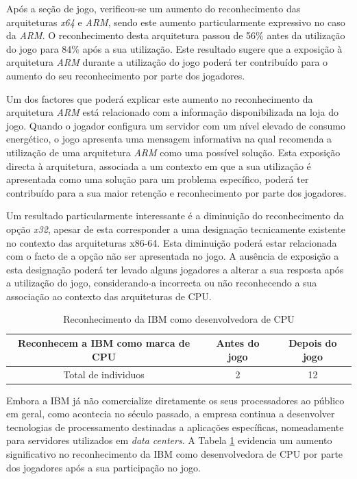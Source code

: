 Após a seção de jogo, verificou-se um aumento do reconhecimento das arquiteturas \textit{x64} e \textit{ARM}, sendo este aumento particularmente expressivo no caso da \textit{ARM}. O reconhecimento desta arquitetura passou de 56\% antes da utilização do jogo para 84\% após a sua utilização. Este resultado sugere que a exposição à arquitetura \textit{ARM} durante a utilização do jogo poderá ter contribuído para o aumento do seu reconhecimento por parte dos jogadores.

Um dos factores que poderá explicar este aumento no reconhecimento da arquitetura \textit{ARM} está relacionado com a informação disponibilizada na loja do jogo. Quando o jogador configura um servidor com um nível elevado de consumo energético, o jogo apresenta uma mensagem informativa na qual recomenda a utilização de uma arquitetura \textit{ARM} como uma possível solução. Esta exposição directa à arquitetura, associada a um contexto em que a sua utilização é apresentada como uma solução para um problema específico, poderá ter contribuído para a sua maior retenção e reconhecimento por parte dos jogadores.

Um resultado particularmente interessante é a diminuição do reconhecimento da opção \textit{x32}, apesar de esta corresponder a uma designação tecnicamente existente no contexto das arquiteturas x86-64. Esta diminuição poderá estar relacionada com o facto de a opção não ser apresentada no jogo. A ausência de exposição a esta designação poderá ter levado alguns jogadores a alterar a sua resposta após a utilização do jogo, considerando-a incorrecta ou não reconhecendo a sua associação ao contexto das arquiteturas de CPU.

\begin{table}[H]
    \centering
    \begin{tabular}{|c|c|c|}
        \hline
        \textbf{Reconhecem a IBM como marca de \ac{CPU}} & \textbf{Antes do jogo} & \textbf{Depois do jogo} \\ \hline
        Total de individuos & 2 & 12 \\ \hline
    \end{tabular}
    \caption{Reconhecimento da IBM como desenvolvedora de \ac{CPU}}
    \label{tab:IBM}
\end{table}

Embora a IBM já não comercialize diretamente os seus processadores ao público em geral, como acontecia no século passado, a empresa continua a desenvolver tecnologias de processamento destinadas a aplicações específicas, nomeadamente para servidores utilizados em \textit{data centers}. A Tabela \ref{tab:IBM} evidencia um aumento significativo no reconhecimento da IBM como desenvolvedora de \ac{CPU} por parte dos jogadores após a sua participação no jogo.

